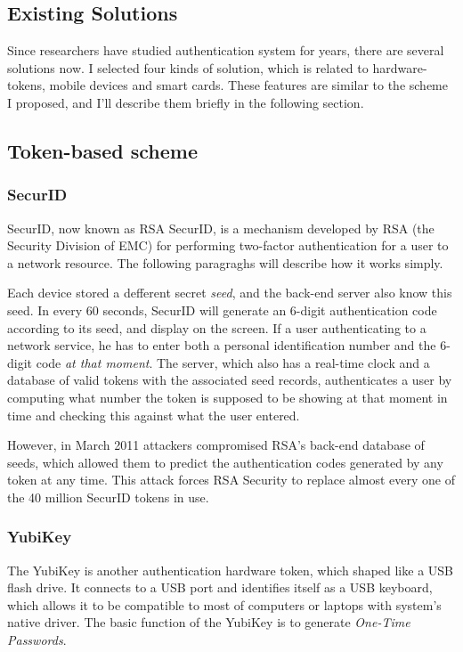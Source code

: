 \begin{CJK}{Bg5}{bsmi}
\section{Existing Solutions}
\label{sec:related-work}

Since researchers have studied authentication system for years, there are several solutions now. I selected four kinds of solution, which is related to hardware-tokens, mobile devices and smart cards. These features are similar to the scheme I proposed, and I'll describe them briefly in the following section.

\subsection{Token-based scheme}

\subsubsection{SecurID}

SecurID, now known as RSA SecurID\cite{rsa-securid}, is a mechanism developed by RSA (the Security Division of EMC) for performing two-factor authentication for a user to a network resource. The following paragraghs will describe how it works simply.

Each device stored a defferent secret \emph{seed}, and the back-end server also know this seed. In every 60 seconds, SecurID will generate an 6-digit authentication code according to its seed, and display on the screen. If a user authenticating to a network service, he has to enter both a personal identification number and the 6-digit code \emph{at that moment}. The server, which also has a real-time clock and a database of valid tokens with the associated seed records, authenticates a user by computing what number the token is supposed to be showing at that moment in time and checking this against what the user entered.

However, in March 2011 attackers compromised RSA's back-end database of seeds\cite{rsa-hack}, which allowed them to predict the authentication codes generated by any token at any time. This attack forces RSA Security to replace almost every one of the 40 million SecurID tokens in use.

\subsubsection{YubiKey}

The YubiKey\cite{yubikey} is another authentication hardware token, which shaped like a USB flash drive. It connects to a USB port and identifies itself as a USB keyboard, which allows it to be compatible to most of computers or laptops with system's native driver. The basic function of the YubiKey is to generate \emph{One-Time Passwords}. 


\end{CJK}
